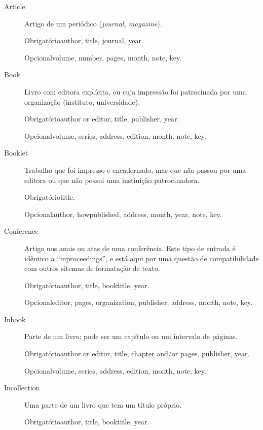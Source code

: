 \documentclass[article,openany]{memoir}
\newcommand{\obrigatorios}{%
   \par Obrigatório\dotfill\ignorespaces}
\newcommand{\opcionais}{
   \par Opcional\dotfill\ignorespaces}
\begin{document}
\begin{description}
\item[Article] 
Artigo de um periódico (\emph{journal, magazine}).

  \obrigatorios author, title, journal, year.

  \opcionais volume, number, pages, month, note, key.

\item[Book]
Livro com editora explícita, ou cuja impressão foi patrocinada por uma
organização (instituto, universidade).

  \obrigatorios author or editor, title, publisher, year.

  \opcionais volume, series, address, edition, month, note, key.

\item[Booklet]
Trabalho que foi impresso e encadernado, mas que não passou por uma
editora ou que não possui uma instiuição patrocinadora.

  \obrigatorios title.

  \opcionais author, howpublished, address, month, year, note, key.

\item[Conference]
Artigo nos anais ou atas de uma conferência. Este tipo de entrada é
idêntico a ``inproceedings'', e está aqui por uma questão de
compatibilidade com outros sitemas de formatação de texto.

  \obrigatorios author, title, booktitle, year.

  \opcionais editor, pages, organization, publisher, address, month, note, key.


\item[Inbook]
Parte de um livro; pode ser um capítulo ou um intervalo de páginas.

  \obrigatorios author or editor, title, chapter and/or pages, publisher, year.

  \opcionais volume, series, address, edition, month, note, key.


\item[Incollection]
Uma parte de um livro que tem um título próprio.


  \obrigatorios author, title, booktitle, year.


\end{description}
\end{document}
